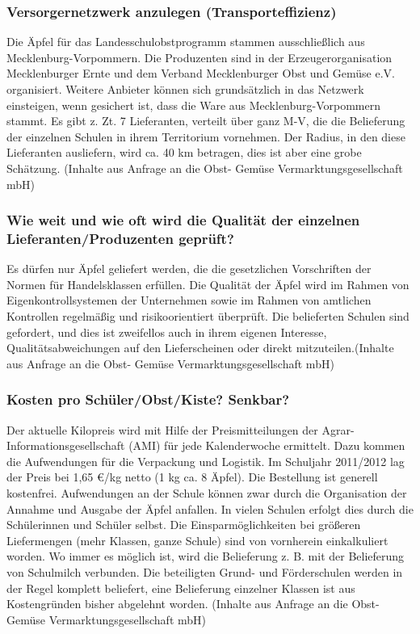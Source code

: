 \subsubsection{Versorgernetzwerk anzulegen (Transporteffizienz)}

Die Äpfel für das Landesschulobstprogramm stammen ausschließlich aus Mecklenburg-Vorpommern. Die Produzenten sind in der Erzeugerorganisation Mecklenburger Ernte und dem Verband Mecklenburger Obst und Gemüse e.V. organisiert. Weitere Anbieter können sich grundsätzlich in das Netzwerk einsteigen, wenn gesichert ist, dass die Ware aus Mecklenburg-Vorpommern stammt. Es gibt z. Zt. 7 Lieferanten, verteilt über ganz M-V, die die Belieferung der einzelnen Schulen in ihrem Territorium vornehmen. Der Radius, in den diese Lieferanten ausliefern, wird ca. 40 km betragen, dies ist aber eine grobe Schätzung. (Inhalte aus Anfrage an die Obst- Gemüse Vermarktungsgesellschaft mbH)

\subsubsection{Wie weit und wie oft wird die Qualität der einzelnen Lieferanten/Produzenten geprüft?}

Es dürfen nur Äpfel geliefert werden, die die gesetzlichen Vorschriften der Normen für Handelsklassen erfüllen. Die Qualität der Äpfel wird im Rahmen von Eigenkontrollsystemen der Unternehmen sowie im Rahmen von amtlichen Kontrollen regelmäßig und risikoorientiert überprüft. Die belieferten Schulen sind gefordert, und dies ist zweifellos auch in ihrem eigenen Interesse, Qualitätsabweichungen auf den Lieferscheinen oder direkt mitzuteilen.(Inhalte aus Anfrage an die Obst- Gemüse Vermarktungsgesellschaft mbH)

\subsubsection{Kosten pro Schüler/Obst/Kiste? Senkbar?}

Der aktuelle Kilopreis wird mit Hilfe der Preismitteilungen der Agrar-Informationsgesellschaft (AMI) für jede Kalenderwoche ermittelt. Dazu kommen die Aufwendungen für die Verpackung und Logistik. Im Schuljahr 2011/2012 lag der Preis bei 1,65 €/kg netto (1 kg ca. 8 Äpfel). Die Bestellung ist generell kostenfrei. Aufwendungen an der Schule können zwar durch die Organisation der Annahme und Ausgabe der Äpfel anfallen. In vielen Schulen erfolgt dies durch die Schülerinnen und Schüler selbst. Die Einsparmöglichkeiten bei größeren Liefermengen (mehr Klassen, ganze Schule) sind von vornherein einkalkuliert worden. Wo immer es möglich ist, wird die Belieferung z. B. mit der Belieferung von Schulmilch verbunden. Die beteiligten Grund- und Förderschulen werden in der Regel komplett beliefert, eine Belieferung einzelner Klassen ist aus Kostengründen bisher abgelehnt worden. (Inhalte aus Anfrage an die Obst- Gemüse Vermarktungsgesellschaft mbH)
